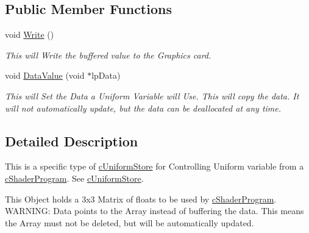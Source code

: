 \subsection*{Public Member Functions}
\begin{DoxyCompactItemize}
\item 
\hypertarget{classc_uniform_matrix3_a169cb2cac5f4f6b8c901a0549c6d836f}{
void \hyperlink{classc_uniform_matrix3_a169cb2cac5f4f6b8c901a0549c6d836f}{Write} ()}
\label{classc_uniform_matrix3_a169cb2cac5f4f6b8c901a0549c6d836f}

\begin{DoxyCompactList}\small\item\em This will Write the buffered value to the Graphics card. \end{DoxyCompactList}\item 
\hypertarget{classc_uniform_matrix3_a8f2c05fbc4b28fd906a31d90ef94b971}{
void \hyperlink{classc_uniform_matrix3_a8f2c05fbc4b28fd906a31d90ef94b971}{DataValue} (void $\ast$lpData)}
\label{classc_uniform_matrix3_a8f2c05fbc4b28fd906a31d90ef94b971}

\begin{DoxyCompactList}\small\item\em This will Set the Data a Uniform Variable will Use. This will copy the data. It will not automatically update, but the data can be deallocated at any time. \end{DoxyCompactList}\end{DoxyCompactItemize}


\subsection{Detailed Description}
This is a specific type of \hyperlink{classc_uniform_store}{cUniformStore} for Controlling Uniform variable from a \hyperlink{classc_shader_program}{cShaderProgram}. See \hyperlink{classc_uniform_store}{cUniformStore}. 

This Object holds a 3x3 Matrix of floats to be used by \hyperlink{classc_shader_program}{cShaderProgram}. WARNING: Data points to the Array instead of buffering the data. This means the Array must not be deleted, but will be automatically updated. 